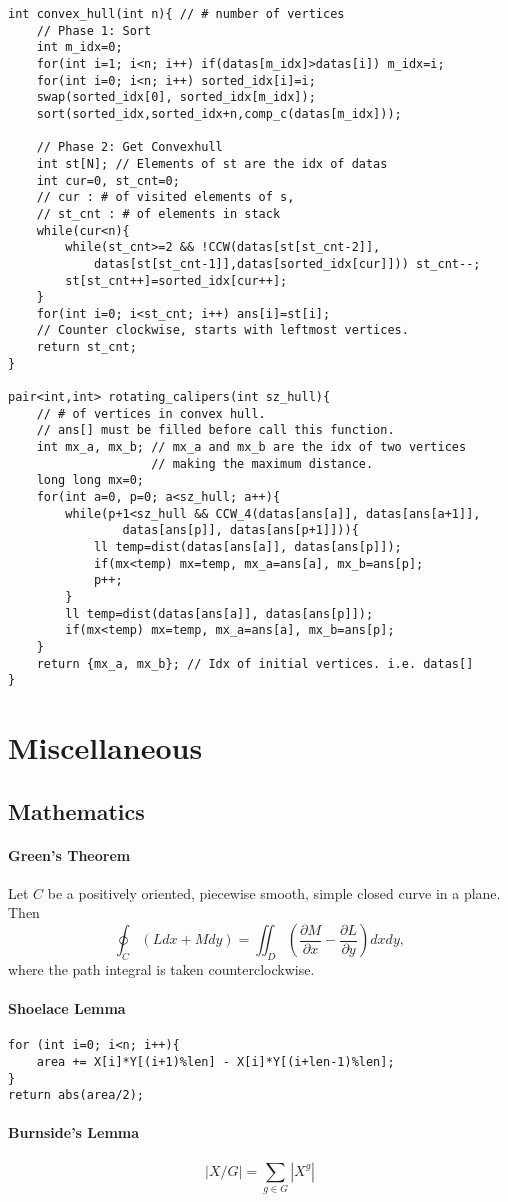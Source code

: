 \documentclass[10pt, landscape]{article}
\begin{document}
\begin{multicols}{2}
\begin{verbatim}
int convex_hull(int n){ // # number of vertices
    // Phase 1: Sort
    int m_idx=0;
    for(int i=1; i<n; i++) if(datas[m_idx]>datas[i]) m_idx=i;
    for(int i=0; i<n; i++) sorted_idx[i]=i;
    swap(sorted_idx[0], sorted_idx[m_idx]);
    sort(sorted_idx,sorted_idx+n,comp_c(datas[m_idx]));
    
    // Phase 2: Get Convexhull
    int st[N]; // Elements of st are the idx of datas 
    int cur=0, st_cnt=0; 
    // cur : # of visited elements of s, 
    // st_cnt : # of elements in stack
    while(cur<n){
        while(st_cnt>=2 && !CCW(datas[st[st_cnt-2]],
            datas[st[st_cnt-1]],datas[sorted_idx[cur]])) st_cnt--;
        st[st_cnt++]=sorted_idx[cur++];
    }
    for(int i=0; i<st_cnt; i++) ans[i]=st[i]; 
    // Counter clockwise, starts with leftmost vertices.
    return st_cnt;
}

pair<int,int> rotating_calipers(int sz_hull){ 
    // # of vertices in convex hull.
    // ans[] must be filled before call this function.
    int mx_a, mx_b; // mx_a and mx_b are the idx of two vertices 
                    // making the maximum distance.
    long long mx=0;
    for(int a=0, p=0; a<sz_hull; a++){
        while(p+1<sz_hull && CCW_4(datas[ans[a]], datas[ans[a+1]],
                datas[ans[p]], datas[ans[p+1]])){
            ll temp=dist(datas[ans[a]], datas[ans[p]]);
            if(mx<temp) mx=temp, mx_a=ans[a], mx_b=ans[p];
            p++;
        }
        ll temp=dist(datas[ans[a]], datas[ans[p]]);
        if(mx<temp) mx=temp, mx_a=ans[a], mx_b=ans[p];
    }
    return {mx_a, mx_b}; // Idx of initial vertices. i.e. datas[]
}

\end{verbatim}

\section{Miscellaneous}
\subsection{Mathematics}
\paragraph{Green's Theorem} Let $C$ be a positively oriented, piecewise smooth, simple closed curve in a plane. Then 
\[
\oint_C(Ldx+Mdy) = \iint_D \left( \dfrac{\partial M}{\partial x} - \dfrac{\partial L}{\partial y}\right)dxdy,
\]
where the path integral is taken counterclockwise.

\paragraph{Shoelace Lemma}
\begin{verbatim}
for (int i=0; i<n; i++){
    area += X[i]*Y[(i+1)%len] - X[i]*Y[(i+len-1)%len];
}
return abs(area/2);
\end{verbatim}

\paragraph{Burnside's Lemma}
\[
|X/G| = \sum_{g \in G} |X^g|
\]
\end{multicols}
\end{document}
